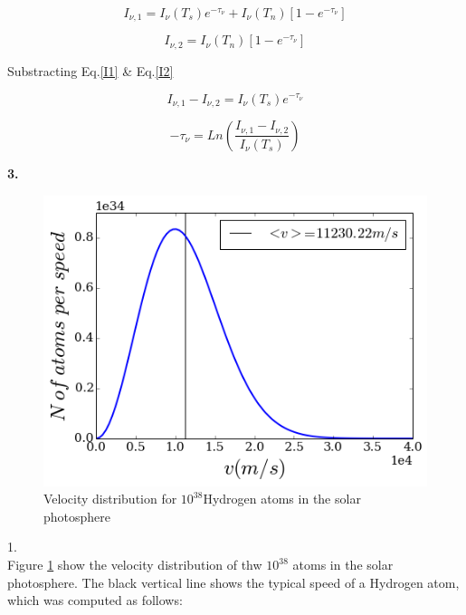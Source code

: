 \documentclass[12pt]{article}
\begin{document}
\begin{equation}\label{I1}
I_{\nu, 1 } = I_{\nu}(T_s)e^{-\tau_{\nu}} + I_{\nu}(T_n)\left[ 1 - e^{-\tau_{\nu}} \right]
\end{equation}

\begin{equation}\label{I2}
I_{\nu, 2} = I_{\nu}(T_n)\left[ 1 - e^{-\tau_{\nu}} \right]
\end{equation}

Substracting Eq.\ref{I1} \& Eq.\ref{I2}

\begin{equation}
I_{\nu, 1} - I_{\nu, 2} = I_{\nu}(T_s)e^{-\tau_{\nu}}
\end{equation}



\begin{equation}
-\tau_{\nu} = Ln \left( \dfrac{I_{\nu, 1} - I_{\nu, 2}}{I_{\nu}(T_s)}  \right)
\end{equation}

\begin{LARGE}
\textbf{3.}
\end{LARGE}

\begin{figure}[H]
\centering
\includegraphics[scale=0.5]{mbv.png}
\caption{Velocity distribution for $10^{38}$Hydrogen atoms 
in the solar photosphere\label{mbv}}
\end{figure}

1. \\
Figure \ref{mbv} show the velocity distribution of thw $10^{38}$ atoms
in the solar photosphere. The black vertical line shows the typical
speed of a Hydrogen atom, which was computed as follows:
\end{document}
